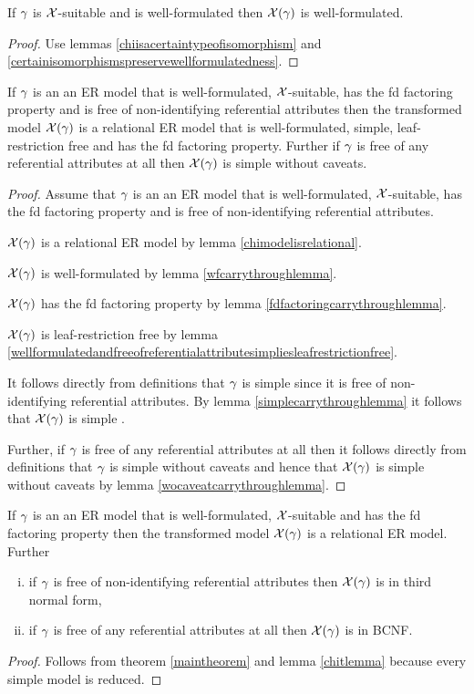 \begin{lemma}
If  $\gamma$ is $\mathcal{X}$-suitable and is well-formulated then  $\mathcal{X}(\gamma)$ is well-formulated. 
\end{lemma}
\begin{proof}
Use lemmas \ref{chiisacertaintypeofisomorphism} and \ref{certainisomorphismspreservewellformulatedness}.
\end{proof}

\begin{lemma}
If  $\gamma$ is an an ER model that is well-formulated,  $\mathcal{X}$-suitable, has the fd factoring property 
and is free of non-identifying referential attributes
then the transformed model $\mathcal{X}(\gamma)$ is a  relational ER model that is well-formulated, simple, leaf-restriction free
and has the fd factoring property.   
Further if $\gamma$ is free of any referential attributes at all then  $\mathcal{X}(\gamma)$ is simple without caveats.
\end{lemma}
\begin{proof}
Assume that $\gamma$ is an an ER model that is well-formulated,  $\mathcal{X}$-suitable, has the fd factoring property and
is free of non-identifying referential attributes. 

$\mathcal{X}(\gamma)$ is a  relational ER model by lemma \ref{chimodelisrelational}.

$\mathcal{X}(\gamma)$ is well-formulated by lemma \ref{wfcarrythroughlemma}.

$\mathcal{X}(\gamma)$ has the fd factoring property by lemma \ref{fdfactoringcarrythroughlemma}.

$\mathcal{X}(\gamma)$ is leaf-restriction free by lemma \ref{wellformulatedandfreeofreferentialattributesimpliesleafrestrictionfree}.

It follows directly from definitions that $\gamma$ is simple since it is free of non-identifying referential attributes.
By lemma \ref{simplecarrythroughlemma} it follows that $\mathcal{X}(\gamma)$ is simple .

Further, if $\gamma$ is free of any referential attributes at all then it follows directly from definitions that $\gamma$ is simple without caveats
and hence  that $\mathcal{X}(\gamma)$ is simple without caveats by lemma \ref{wocaveatcarrythroughlemma}.
\end{proof}

\begin{theorem}
If  $\gamma$ is an an ER model that is well-formulated,  $\mathcal{X}$-suitable and has the fd factoring property
then the transformed model $\mathcal{X}(\gamma)$ is a  relational ER model. Further
\begin{enumerate}[(i)]
\item  if $\gamma$ is free of non-identifying referential attributes then  $\mathcal{X}(\gamma)$ is in third normal form, 
\item 
if $\gamma$ is free of any referential attributes at all then  $\mathcal{X}(\gamma)$ is in BCNF.
\end{enumerate}
\end{theorem}
\begin{proof}
Follows from theorem \ref{maintheorem} and lemma \ref{chitlemma} because every simple model is reduced.
\end{proof}

